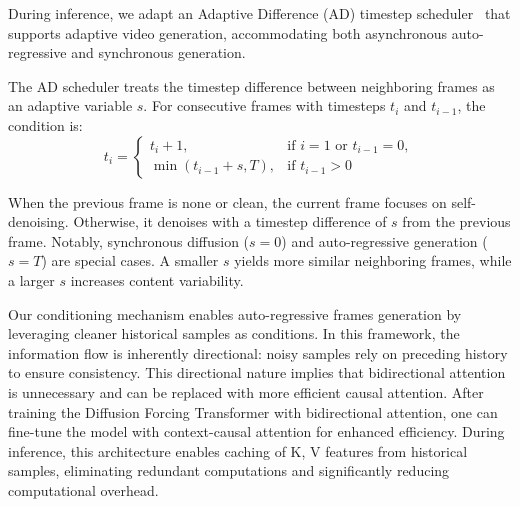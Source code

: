 \documentclass{article}
\begin{document}
{%


During inference, we adapt an Adaptive Difference (AD) timestep scheduler~\cite{sun2025ar} that supports adaptive video generation, accommodating both asynchronous auto-regressive and synchronous generation.

The AD scheduler treats the timestep difference between neighboring frames as an adaptive variable \(s\). For consecutive frames with timesteps \(t_i\) and \(t_{i-1}\), the condition is:
\[
t_i = 
\begin{cases} 
t_i + 1, & \text{if } i = 1 \text{ or } t_{i-1} = 0, \\
\min(t_{i-1} + s, T), & \text{if } t_{i-1} > 0
\end{cases}
\]

When the previous frame is none or clean, the current frame focuses on self-denoising. Otherwise, it denoises with a timestep difference of \(s\) from the previous frame. Notably, synchronous diffusion (\(s = 0\)) and auto-regressive generation (\(s = T\)) are special cases. A smaller \(s\) yields more similar neighboring frames, while a larger \(s\) increases content variability. 

Our conditioning mechanism enables auto-regressive frames generation by leveraging cleaner historical samples as conditions. In this framework, the information flow is inherently directional: noisy samples rely on preceding history to ensure consistency. This directional nature implies that bidirectional attention is unnecessary and can be replaced with more efficient causal attention. 
After training the Diffusion Forcing Transformer with bidirectional attention, one can fine-tune the model with context-causal attention for enhanced efficiency. During inference, this architecture enables caching of K, V features from historical samples, eliminating redundant computations and significantly reducing computational overhead.

}
\end{document}
